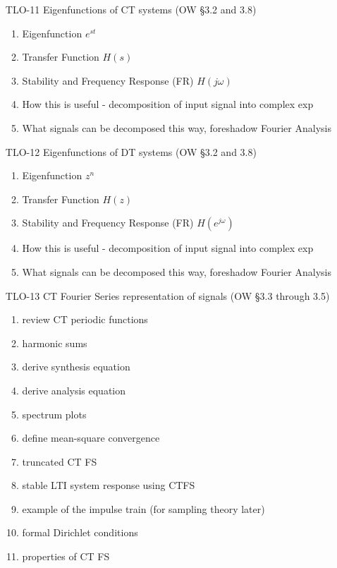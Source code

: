 \begin{enumerate}
\item[TLO-11] Eigenfunctions of CT systems (OW \S 3.2 and 3.8)
  \begin{enumerate}
  \item Eigenfunction $e^{st}$
  \item Transfer Function $H(s)$
  \item Stability and Frequency Response (FR)  $H(j\omega)$
  \item How this is useful - decomposition of input signal into complex exp
  \item What signals can be decomposed this way, foreshadow Fourier Analysis
  \end{enumerate}
  
\item[TLO-12] Eigenfunctions of DT systems (OW \S 3.2 and 3.8)
  \begin{enumerate}
  \item Eigenfunction $z^{n}$
  \item Transfer Function $H(z)$
  \item Stability and Frequency Response (FR) $H\left(e^{j\omega}\right)$
  \item How this is useful - decomposition of input signal into complex exp
  \item What signals can be decomposed this way, foreshadow Fourier Analysis
  \end{enumerate}
  
\item[TLO-13] CT Fourier Series representation of signals (OW \S 3.3 through 3.5)
  \begin{enumerate}
  \item review CT periodic functions
  \item harmonic sums
  \item derive synthesis equation
  \item derive analysis equation
  \item spectrum plots
  \item define mean-square convergence
  \item truncated CT FS
  \item stable LTI system response using CTFS
  \item example of the impulse train (for sampling theory later)
  \item formal Dirichlet conditions
  \item properties of CT FS
  \end{enumerate}


\end{enumerate}
